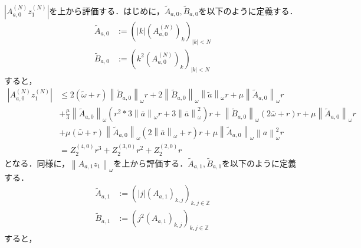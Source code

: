 \documentclass[11pt,a4paper]{jsarticle}
\theoremstyle{definition}
\begin{document}
$\left| A_{a,0}^{(N)} z_1^{(N)} \right|$を上から評価する．はじめに，$\tilde{A}_{a,0}, \tilde{B}_{a,0}$を以下のように定義する．
\begin{align*}
  \tilde{A}_{a,0} & := \left( \left| k \right| \left( A_{a,0}^{(N)} \right)_k \right)_{|k|<N} \\
  \tilde{B}_{a,0} & := \left( k^2 \left( A_{a,0}^{(N)} \right)_k \right)_{|k|<N}
\end{align*}
すると，
\begin{equation*}
  \begin{split}
    \left| A_{a,0}^{(N)} z_1^{(N)} \right| &\leq 2\left(\tilde{\omega} + r\right) \left\| \tilde{B}_{a,0} \right\|_\omega r + 2 \left\| \tilde{B}_{a,0} \right\|_\omega \left\| \tilde{a} \right\|_\omega r + \mu \left\| \tilde{A}_{a,0} \right\|_\omega r \\
    &+ \frac{\mu}{3} \left\| \tilde{A}_{a,0} \right\|_\omega \left( r^2 * 3 \left\| \bar{a} \right\|_\omega r + 3 \left\| \bar{a} \right\|^2_\omega \right) r + \left\| \tilde{B}_{a,0} \right\|_\omega \left( 2\bar{\omega} + r\right)r + \mu \left\| \tilde{A}_{a,0} \right\|_\omega r \\
    &+ \mu\left(\bar{\omega}+r\right)\left\| \tilde{A}_{a,0} \right\|_\omega \left( 2 \left\| \bar{a} \right\|_{\omega} + r\right)r + \mu \left\| \tilde{A}_{a,0} \right\|_\omega \left\| a \right\|_\omega^2 r\\
    &= Z_2^{(4,0)} r^3 + Z_2^{(3,0)} r^2 + Z_2^{(2,0)} r
  \end{split}
\end{equation*}
となる．同様に，$\left\| A_{a,1} z_1 \right\|_\omega$を上から評価する．$\tilde{A}_{a,1}, \tilde{B}_{a,1}$を以下のように定義する．
\begin{align*}
  \tilde{A}_{a,1} & := \left( \left| j \right| \left( A_{a,1} \right)_{k,j} \right)_{k,j\in\mathbb{Z}} \\
  \tilde{B}_{a,1} & := \left( j^2 \left( A_{a,1} \right)_{k,j} \right)_{k,j\in\mathbb{Z}}
\end{align*}
すると，
\end{document}
